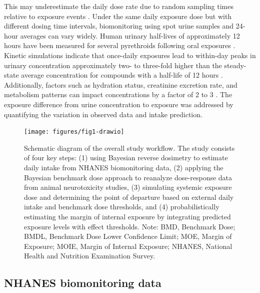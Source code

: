 \documentclass[toxics,article,submit,pdftex,moreauthors]{Definitions/mdpi}
\begin{document}
\begin{itemize}
  This may underestimate the daily dose rate due to random sampling
  times relative to exposure events \citep{aylward_interpreting_2012}.
  Under the same daily exposure dose but with different dosing time
  intervals, biomonitoring using spot urine samples and 24-hour averages
  can vary widely. Human urinary half-lives of approximately 12
  hours have been measured for several pyrethroids following oral
  exposures \citep{leng1997biological, woollen_metabolism_1992}. Kinetic
  simulations indicate that once-daily exposures lead to within-day
  peaks in urinary concentration approximately two- to three-fold higher
  than the steady-state average concentration for compounds with a
  half-life of 12 hours \citep{aylward_screening_level_2018}.
  Additionally, factors such as hydration status, creatinine excretion
  rate, and metabolism patterns can impact concentrations by a factor of
  2 to 3 \citep{scher2007agreement}. The exposure difference from urine
  concentration to exposure was addressed by quantifying the variation
  in observed data and intake prediction.
\end{itemize}

\begin{figure}[H]
\centering
\begin{adjustwidth}{-4cm}{}
\centering
\texttt{[image: figures/fig1-drawio]}
\hfill
\end{adjustwidth}
\caption{Schematic diagram of the overall study workflow. The study consists of 
four key steps: (1) using Bayesian reverse dosimetry to estimate daily intake from 
NHANES biomonitoring data, (2) applying 
the Bayesian benchmark dose approach to reanalyze dose-response data from animal 
neurotoxicity studies, (3) simulating systemic exposure dose and determining the 
point of departure based on external daily intake and benchmark dose thresholds, 
and (4) probabilistically estimating the margin of internal exposure by integrating 
predicted exposure levels with effect thresholds. Note: BMD, Benchmark Dose; BMDL, Benchmark Dose Lower Confidence Limit; MOE, Margin of Exposure; MOIE, Margin of Internal Exposure; NHANES, National Health and Nutrition Examination Survey.\label{fig1}}
\end{figure}


\subsection{NHANES biomonitoring data}\label{nhanes-biomonitoring-data}
\end{document}
